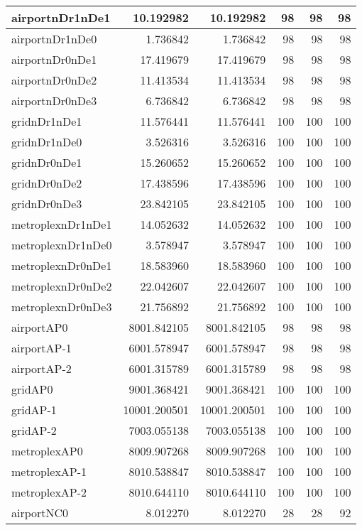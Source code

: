 \begin{longtable}{|l|r|r|r|r|r|}
\endlastfoot
airportnDr1nDe1 & 10.192982 & 10.192982 & 98 & 98 & 98 \\ \hline
airportnDr1nDe0 & 1.736842 & 1.736842 & 98 & 98 & 98 \\ \hline
airportnDr0nDe1 & 17.419679 & 17.419679 & 98 & 98 & 98 \\ \hline
airportnDr0nDe2 & 11.413534 & 11.413534 & 98 & 98 & 98 \\ \hline
airportnDr0nDe3 & 6.736842 & 6.736842 & 98 & 98 & 98 \\ \hline
gridnDr1nDe1 & 11.576441 & 11.576441 & 100 & 100 & 100 \\ \hline
gridnDr1nDe0 & 3.526316 & 3.526316 & 100 & 100 & 100 \\ \hline
gridnDr0nDe1 & 15.260652 & 15.260652 & 100 & 100 & 100 \\ \hline
gridnDr0nDe2 & 17.438596 & 17.438596 & 100 & 100 & 100 \\ \hline
gridnDr0nDe3 & 23.842105 & 23.842105 & 100 & 100 & 100 \\ \hline
metroplexnDr1nDe1 & 14.052632 & 14.052632 & 100 & 100 & 100 \\ \hline
metroplexnDr1nDe0 & 3.578947 & 3.578947 & 100 & 100 & 100 \\ \hline
metroplexnDr0nDe1 & 18.583960 & 18.583960 & 100 & 100 & 100 \\ \hline
metroplexnDr0nDe2 & 22.042607 & 22.042607 & 100 & 100 & 100 \\ \hline
metroplexnDr0nDe3 & 21.756892 & 21.756892 & 100 & 100 & 100 \\ \hline
airportAP0 & 8001.842105 & 8001.842105 & 98 & 98 & 98 \\ \hline
airportAP-1 & 6001.578947 & 6001.578947 & 98 & 98 & 98 \\ \hline
airportAP-2 & 6001.315789 & 6001.315789 & 98 & 98 & 98 \\ \hline
gridAP0 & 9001.368421 & 9001.368421 & 100 & 100 & 100 \\ \hline
gridAP-1 & 10001.200501 & 10001.200501 & 100 & 100 & 100 \\ \hline
gridAP-2 & 7003.055138 & 7003.055138 & 100 & 100 & 100 \\ \hline
metroplexAP0 & 8009.907268 & 8009.907268 & 100 & 100 & 100 \\ \hline
metroplexAP-1 & 8010.538847 & 8010.538847 & 100 & 100 & 100 \\ \hline
metroplexAP-2 & 8010.644110 & 8010.644110 & 100 & 100 & 100 \\ \hline
airportNC0 & 8.012270 & 8.012270 & 28 & 28 & 92 \\ \hline

\end{longtable}
